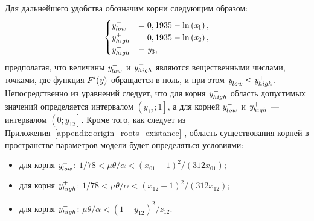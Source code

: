 Для дальнейшего удобства обозначим корни следующим образом:
\begin{equation}
    \begin{cases}
        \label{eq:origin_stability_bounds_y}
        \mathit{y}^{-}_{low}    &= 0,1935 - \ln\left( \mathit{x}_{1} \right), \\
        \mathit{y}^{+}_{high}   &= 0,1935 - \ln\left( \mathit{x}_{2} \right), \\
        \mathit{y}^{-}_{high}   &= \mathit{y}_{3}, \\
    \end{cases}
\end{equation}
предполагая, что величины $\mathit{y}^{-}_{low}$ и $\mathit{y}^{+}_{high}$ являются вещественными числами, \ie точками, где функция $F^{\prime}(\mathit{y})$ обращается в ноль, и при этом $\mathit{y}^{-}_{low} \le \mathit{y}^{+}_{high}$. Непосредственно из уравнений следует, что для корня $\mathit{y}^{-}_{high}$ область допустимых значений определяется интервалом $\left(y_{12}; 1\right]$, а для корней $\mathit{y}^{-}_{low}$ и $\mathit{y}^{+}_{high}$ --- интервалом $\left(0; y_{12}\right]$. Кроме того, как следует из Приложения~\ref{appendix:origin_roots_existance} , область существования корней в пространстве параметров модели будет определяться условиями:
\begin{itemize}
    \item для корня $\mathit{y}^{-}_{low}$: $1 / 78 < \mu \theta / \alpha < (x_{01} + 1)^{2} / (312 x_{01})$;
    \item для корня $\mathit{y}^{+}_{high}$: $1 / 78 < \mu \theta / \alpha < (x_{12} + 1)^{2} / (312 x_{12})$;
    \item для корня $\mathit{y}^{-}_{high}$: $\mu \theta / \alpha < \left(1 - y_{12}\right)^{2} / z_{12}$.
\end{itemize}

